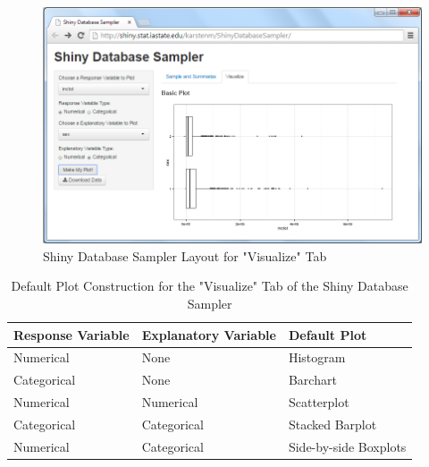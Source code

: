 \documentclass{article}\usepackage[]{graphicx}\usepackage[]{color}
\begin{document}
\begin{figure}[htbp]
\begin{center}
\includegraphics[keepaspectratio=TRUE,width=.99\textwidth]{figure/Visualize.png}
\end{center}
\caption{Shiny Database Sampler Layout for "Visualize" Tab} 
\label{fig:visualizetab}
\end{figure}



\begin{table}[H]
\centering
\begin{tabular}{lll}
\hline 
Response Variable & Explanatory Variable & Default Plot \\
\hline
Numerical & None & Histogram \\
Categorical & None & Barchart \\
Numerical & Numerical & Scatterplot \\
Categorical & Categorical & Stacked Barplot \\
Numerical & Categorical & Side-by-side Boxplots \\

\hline
\end{tabular}
\caption{Default Plot Construction for the "Visualize" Tab of the Shiny Database Sampler} 
\label{tab:defaultplottypes}
\end{table}


% 
% 
\end{document}
